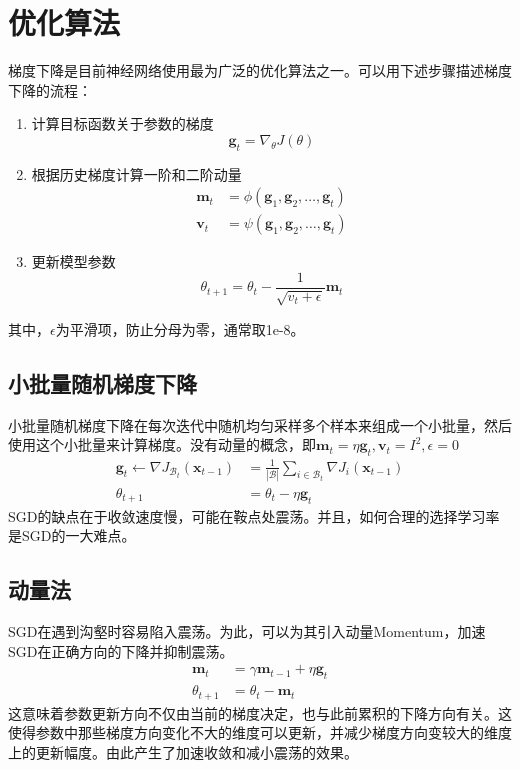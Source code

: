 \chapter{优化算法}
梯度下降是目前神经网络使用最为广泛的优化算法之一。可以用下述步骤描述梯度下降的流程：
\begin{enumerate}
	\item 计算目标函数关于参数的梯度
	\begin{equation}
		\boldsymbol{g}_t = \nabla_{\theta} J(\theta)
	\end{equation}
	\item 根据历史梯度计算一阶和二阶动量
	\begin{equation}
		\begin{aligned}
			\boldsymbol{m}_t &= \phi(\boldsymbol{g}_1, \boldsymbol{g}_2, \dots, \boldsymbol{g}_t) \\
			\boldsymbol{v}_t &= \psi(\boldsymbol{g}_1, \boldsymbol{g}_2, \dots, \boldsymbol{g}_t)
		\end{aligned}
	\end{equation}
	\item 更新模型参数
	\begin{equation}
		\theta_{t+1} = \theta_{t} - \frac{1}{\sqrt{v_t + \epsilon}}\boldsymbol{m}_t
	\end{equation}
\end{enumerate}

其中，$\epsilon$为平滑项，防止分母为零，通常取1e-8。
\section{小批量随机梯度下降}
小批量随机梯度下降在每次迭代中随机均匀采样多个样本来组成一个小批量，然后使用这个小批量来计算梯度。没有动量的概念，即$\boldsymbol{m}_t=\eta \boldsymbol{g}_t, \boldsymbol{v}_t=I^2,\epsilon = 0$
\begin{equation}
\begin{aligned}
	\boldsymbol{g}_t \leftarrow \nabla J_{\mathcal{B}_t}(\boldsymbol{x}_{t-1})  &= \frac{1}{|\mathcal{B}|}\sum_{i \in \mathcal{B}_t}\nabla J_i(\boldsymbol{x}_{t-1})\\
	\theta_{t+1} &= \theta_{t} - \eta \boldsymbol{g}_t
\end{aligned}
\end{equation}
SGD的缺点在于收敛速度慢，可能在鞍点处震荡。并且，如何合理的选择学习率是SGD的一大难点。
\section{动量法}
SGD在遇到沟壑时容易陷入震荡。为此，可以为其引入动量Momentum，加速SGD在正确方向的下降并抑制震荡。
\begin{equation}
\begin{aligned}
	\boldsymbol{m}_t&=\gamma \boldsymbol{m}_{t-1} + \eta \boldsymbol{g}_t\\
	\theta_{t+1} &= \theta_{t} - \boldsymbol{m}_t
\end{aligned}
\end{equation}
这意味着参数更新方向不仅由当前的梯度决定，也与此前累积的下降方向有关。这使得参数中那些梯度方向变化不大的维度可以更新，并减少梯度方向变较大的维度上的更新幅度。由此产生了加速收敛和减小震荡的效果。


